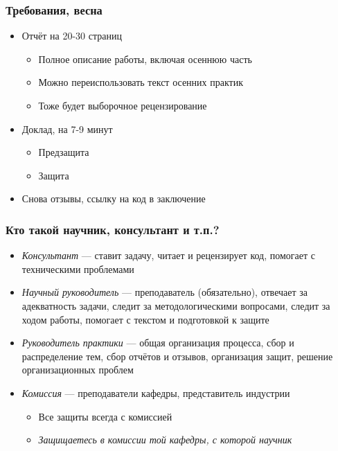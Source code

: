 \documentclass[xetex,mathserif,serif]{beamer}
\begin{document}
    \begin{frame}
        \frametitle{Требования, весна}
        \begin{itemize}
            \item Отчёт на 20-30 страниц
            \begin{itemize}
                \item Полное описание работы, включая осеннюю часть
                \item Можно переиспользовать текст осенних практик
                \item Тоже будет выборочное рецензирование
            \end{itemize}
            \item Доклад, на 7-9 минут
            \begin{itemize}
                \item Предзащита
                \item Защита
            \end{itemize}
            \item Снова отзывы, ссылку на код в заключение
        \end{itemize}
    \end{frame}

    \begin{frame}
        \frametitle{Кто такой научник, консультант и т.п.?}
        \begin{itemize}
            \item \textit{Консультант} --- ставит задачу, читает и рецензирует код, помогает с техническими проблемами
            \item \textit{Научный руководитель} --- преподаватель (обязательно), отвечает за адекватность задачи, следит за методологическими вопросами, следит за ходом работы, помогает с текстом и подготовкой к защите
            \item \textit{Руководитель практики} --- общая организация процесса, сбор и распределение тем, сбор отчётов и отзывов, организация защит, решение организационных проблем
            \item \textit{Комиссия} --- преподаватели кафедры, представитель индустрии
            \begin{itemize}
                \item Все защиты всегда с комиссией
                \item \emph{Защищаетесь в комиссии той кафедры, с которой научник}
            \end{itemize}
        \end{itemize}
    \end{frame}
\end{document}
